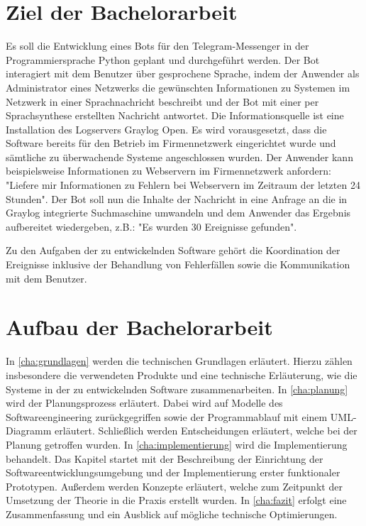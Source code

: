 \section{Ziel der Bachelorarbeit}

Es soll die Entwicklung eines Bots für den Telegram-Messenger in der Programmiersprache Python geplant und durchgeführt werden. Der Bot interagiert mit dem Benutzer über gesprochene Sprache, indem der Anwender als Administrator eines Netzwerks die gewünschten Informationen zu Systemen im Netzwerk in einer Sprachnachricht beschreibt und der Bot mit einer per Sprachsynthese erstellten Nachricht antwortet. Die Informationsquelle ist eine Installation des Logservers Graylog Open. Es wird vorausgesetzt, dass die Software bereits für den Betrieb im Firmennetzwerk eingerichtet wurde und sämtliche zu überwachende Systeme angeschlossen wurden. Der Anwender kann beispielsweise Informationen zu Webservern im Firmennetzwerk anfordern: "Liefere mir Informationen zu Fehlern bei Webservern im Zeitraum der letzten 24 Stunden". Der Bot soll nun die Inhalte der Nachricht in eine Anfrage an die in Graylog integrierte Suchmaschine umwandeln und dem Anwender das Ergebnis aufbereitet wiedergeben, z.B.: "Es wurden 30 Ereignisse gefunden". 

Zu den Aufgaben der zu entwickelnden Software gehört die Koordination der Ereignisse inklusive der Behandlung von Fehlerfällen sowie die Kommunikation mit dem Benutzer.

\section{Aufbau der Bachelorarbeit}

In \autoref{cha:grundlagen} werden die technischen Grundlagen erläutert. Hierzu zählen insbesondere die verwendeten Produkte und eine technische Erläuterung, wie die Systeme in der zu entwickelnden Software zusammenarbeiten. In \autoref{cha:planung} wird der Planungsprozess erläutert. Dabei wird auf Modelle des Softwareengineering zurückgegriffen sowie der Programmablauf mit einem UML-Diagramm erläutert. Schließlich werden Entscheidungen erläutert, welche bei der Planung getroffen wurden. In \autoref{cha:implementierung} wird die Implementierung behandelt. Das Kapitel startet mit der Beschreibung der Einrichtung der Softwareentwicklungsumgebung und der Implementierung erster funktionaler Prototypen. Außerdem werden Konzepte erläutert, welche zum Zeitpunkt der Umsetzung der Theorie in die Praxis erstellt wurden. In \autoref{cha:fazit} erfolgt eine Zusammenfassung und ein Ausblick auf mögliche technische Optimierungen.